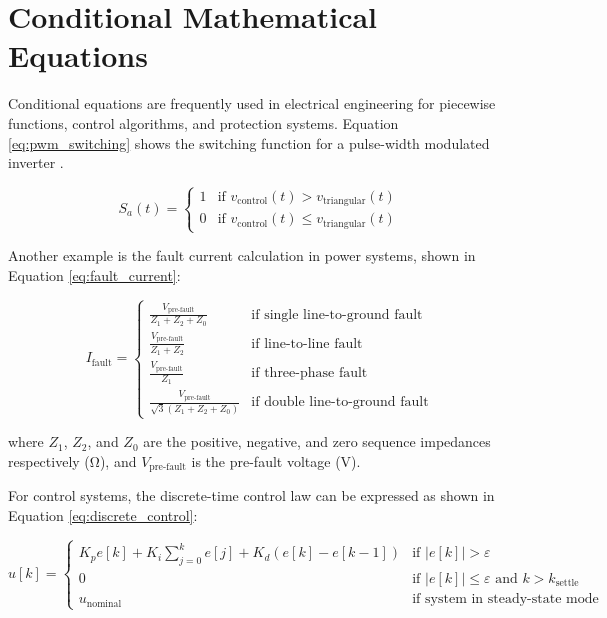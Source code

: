 \section{Conditional Mathematical Equations}
\label{sec:conditional_equations}

Conditional equations are frequently used in electrical engineering for piecewise functions, control algorithms, and protection systems. Equation \ref{eq:pwm_switching} shows the switching function for a pulse-width modulated inverter \cite{rashid2017power}.

\begin{equation}
	S_a(t) = \begin{cases}
		1 & \text{if } v_{\text{control}}(t) > v_{\text{triangular}}(t) \\
		0 & \text{if } v_{\text{control}}(t) \leq v_{\text{triangular}}(t)
	\end{cases}
	\label{eq:pwm_switching}
\end{equation}

Another example is the fault current calculation in power systems, shown in Equation \ref{eq:fault_current}:

\begin{equation}
	I_{\text{fault}} = \begin{cases}
		\frac{V_{\text{pre-fault}}}{Z_1 + Z_2 + Z_0} & \text{if single line-to-ground fault} \\
		\frac{V_{\text{pre-fault}}}{Z_1 + Z_2} & \text{if line-to-line fault} \\
		\frac{V_{\text{pre-fault}}}{Z_1} & \text{if three-phase fault} \\
		\frac{V_{\text{pre-fault}}}{\sqrt{3}(Z_1 + Z_2 + Z_0)} & \text{if double line-to-ground fault}
	\end{cases}
	\label{eq:fault_current}
\end{equation}

where $Z_1$, $Z_2$, and $Z_0$ are the positive, negative, and zero sequence impedances respectively (\unit{\ohm}), and $V_{\text{pre-fault}}$ is the pre-fault voltage (\unit{\volt}).

For control systems, the discrete-time control law can be expressed as shown in Equation \ref{eq:discrete_control}:

\begin{equation}
	u[k] = \begin{cases}
		K_p e[k] + K_i \sum_{j=0}^{k} e[j] + K_d (e[k] - e[k-1]) & \text{if } |e[k]| > \varepsilon \\
		0 & \text{if } |e[k]| \leq \varepsilon \text{ and } k > k_{\text{settle}} \\
		u_{\text{nominal}} & \text{if system in steady-state mode}
	\end{cases}
	\label{eq:discrete_control}
\end{equation}

